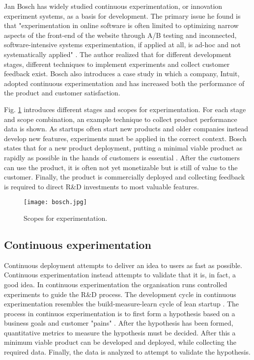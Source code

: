 \documentclass[english]{tktltiki2}
\theoremstyle{definition}
\theoremstyle{remark}
\begin{document}
Jan Bosch has widely studied continuous experimentation, or innovation experiment systems, as a basis for development. The primary issue he found is that "experimentation in online software is often limited to optimizing narrow aspects of the front-end of the website through A/B testing and inconnected, software-intensive systems experimentation, if applied at all, is ad-hoc and not systematically applied" \cite{bosch2012building}. The author realized that for different development stages, different techniques to implement experiments and collect customer feedback exist. Bosch also introduces a case study in which a company, Intuit, adopted continuous experimentation and has increased both the performance of the product and customer satisfaction.

Fig. \ref{fig4} introduces different stages and scopes for experimentation. For each stage and scope combination, an example technique to collect product performance data is shown. As startups often start new products and older companies instead develop new features, experiments must be applied in the correct context. Bosch states that for a new product deployment, putting a minimal viable product as rapidly as possible in the hands of customers is essential \cite{bosch2012building}. After the customers can use the product, it is often not yet monetizable but is still of value to the customer. Finally, the product is commercially deployed and collecting feedback is required to direct R\&D investments to most valuable features.
\begin{figure}[H]
	\centering
	\texttt{[image: bosch.jpg]}
	\caption{Scopes for experimentation\cite{bosch2012building}.}
	\label{fig4}
\end{figure}

\subsection{Continuous experimentation}
Continuous deployment attempts to deliver an idea to users as fast as possible. Continuous experimentation instead attempts to validate that it is, in fact, a good idea. In continuous experimentation the organisation runs controlled experiments to guide the R\&D process. The development cycle in continuous experimentation resembles the build-measure-learn cycle of lean startup \cite{ries2011lean}. The process in continuos experimentation is to first form a hypothesis based on a business goals and customer "pains" \cite{bosch2012building}. After the hypothesis has been formed, quantitative metrics to measure the hypothesis must be decided. After this a minimum viable product can be developed and deployed, while collecting the required data. Finally, the data is analyzed to attempt to validate the hypothesis.
\end{document}
